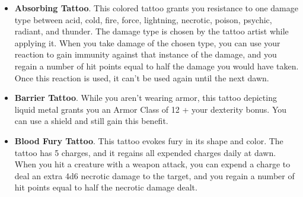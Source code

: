     \begin{itemize}
        \item \textbf{Absorbing Tattoo}.
        This colored tattoo grants you resistance to one damage type between acid, cold, fire, force, lightning, necrotic, poison, psychic, radiant, and thunder.
        The damage type is chosen by the tattoo artist while applying it.
        When you take damage of the chosen type, you can use your reaction to gain immunity against that instance of the damage, and you regain a number of hit points equal to half the damage you would have taken.
        Once this reaction is used, it can't be used again until the next dawn.
        \item \textbf{Barrier Tattoo}.
        While you aren't wearing armor, this tattoo depicting liquid metal grants you an Armor Class of 12 + your dexterity bonus.
        You can use a shield and still gain this benefit.
        \item \textbf{Blood Fury Tattoo}.
        This tattoo evokes fury in its shape and color.
        The tattoo has 5 charges, and it regains all expended charges daily at dawn.
        When you hit a creature with a weapon attack, you can expend a charge to deal an extra 4d6 necrotic damage to the target, and you regain a number of hit points equal to half the necrotic damage dealt.


\end{itemize}
